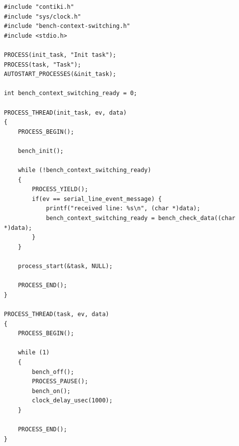 \begin{lstlisting}[style=CStyle, float, label={lst:external-task-code}, caption={Source code of a task using the benchmarking framework}]
#include "contiki.h"
#include "sys/clock.h"
#include "bench-context-switching.h"
#include <stdio.h>

PROCESS(init_task, "Init task");
PROCESS(task, "Task");
AUTOSTART_PROCESSES(&init_task);

int bench_context_switching_ready = 0;

PROCESS_THREAD(init_task, ev, data)
{
    PROCESS_BEGIN();

    bench_init();

    while (!bench_context_switching_ready)
    {
        PROCESS_YIELD();
        if(ev == serial_line_event_message) {
            printf("received line: %s\n", (char *)data);
            bench_context_switching_ready = bench_check_data((char *)data);
        }
    }

    process_start(&task, NULL);

    PROCESS_END();
}

PROCESS_THREAD(task, ev, data)
{
    PROCESS_BEGIN();

    while (1)
    {
        bench_off();
        PROCESS_PAUSE();
        bench_on();
        clock_delay_usec(1000);
    }

    PROCESS_END();
}
\end{lstlisting}
